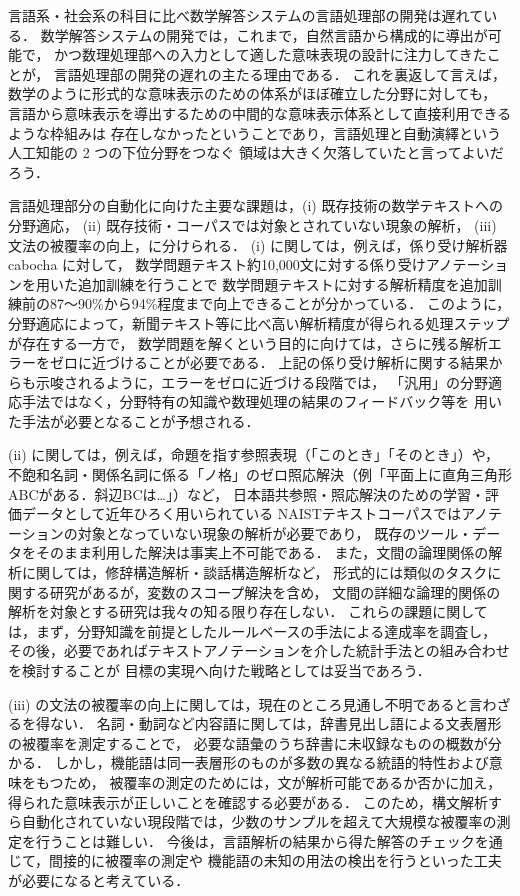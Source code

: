\documentclass[japanese]{jnlp_1.4b}
\begin{document}
言語系・社会系の科目に比べ数学解答システムの言語処理部の開発は遅れている．
数学解答システムの開発では，これまで，自然言語から構成的に導出が可能で，
かつ数理処理部への入力として適した意味表現の設計に注力してきたことが，
言語処理部の開発の遅れの主たる理由である．
これを裏返して言えば，数学のように形式的な意味表示のための体系がほぼ確立した分野に対しても，
言語から意味表示を導出するための中間的な意味表示体系として直接利用できるような枠組みは
存在しなかったということであり，言語処理と自動演繹という人工知能の 2 つの下位分野をつなぐ
領域は大きく欠落していたと言ってよいだろう．

言語処理部分の自動化に向けた主要な課題は，(i) 既存技術の数学テキストへの分野適応，
(ii) 既存技術・コーパスでは対象とされていない現象の解析，
(iii) 文法の被覆率の向上，に分けられる．
(i) に関しては，例えば，係り受け解析器 cabocha \cite{cabocha}に対して，
数学問題テキスト約10,000文に対する係り受けアノテーションを用いた追加訓練を行うことで
数学問題テキストに対する解析精度を追加訓練前の87〜90\%から94\%程度まで向上できることが分かっている．
このように，分野適応によって，新聞テキスト等に比べ高い解析精度が得られる処理ステップが存在する一方で，
数学問題を解くという目的に向けては，さらに残る解析エラーをゼロに近づけることが必要である．
上記の係り受け解析に関する結果からも示唆されるように，エラーをゼロに近づける段階では，
「汎用」の分野適応手法ではなく，分野特有の知識や数理処理の結果のフィードバック等を
用いた手法が必要となることが予想される．

(ii) に関しては，例えば，命題を指す参照表現（「このとき」「そのとき」）や，
不飽和名詞・関係名詞に係る「ノ格」のゼロ照応解決（例「平面上に直角三角形ABCがある．斜辺BCは…」）など，
日本語共参照・照応解決のための学習・評価データとして近年ひろく用いられている
NAISTテキストコーパス\cite{NTC2015}ではアノテーションの対象となっていない現象の解析が必要であり，
既存のツール・データをそのまま利用した解決は事実上不可能である．
また，文間の論理関係の解析に関しては，修辞構造解析・談話構造解析など，
形式的には類似のタスクに関する研究があるが，変数のスコープ解決を含め，
文間の詳細な論理的関係の解析を対象とする研究は我々の知る限り存在しない．
これらの課題に関しては，まず，分野知識を前提としたルールベースの手法による達成率を調査し，
その後，必要であればテキストアノテーションを介した統計手法との組み合わせを検討することが
目標の実現へ向けた戦略としては妥当であろう．

(iii) の文法の被覆率の向上に関しては，現在のところ見通し不明であると言わざるを得ない．
名詞・動詞など内容語に関しては，辞書見出し語による文表層形の被覆率を測定することで，
必要な語彙のうち辞書に未収録なものの概数が分かる．
しかし，機能語は同一表層形のものが多数の異なる統語的特性および意味をもつため，
被覆率の測定のためには，文が解析可能であるか否かに加え，得られた意味表示が正しいことを確認する必要がある．
このため，構文解析すら自動化されていない現段階では，少数のサンプルを超えて大規模な被覆率の測定を行うことは難しい．
今後は，言語解析の結果から得た解答のチェックを通じて，間接的に被覆率の測定や
機能語の未知の用法の検出を行うといった工夫が必要になると考えている．
\end{document}
